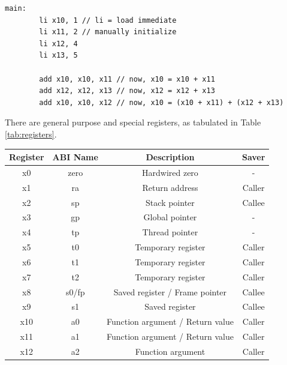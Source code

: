 \begin{lstlisting}[]
    main:
        li x10, 1 // li = load immediate
        li x11, 2 // manually initialize
        li x12, 4
        li x13, 5

        add x10, x10, x11 // now, x10 = x10 + x11
        add x12, x12, x13 // now, x12 = x12 + x13
        add x10, x10, x12 // now, x10 = (x10 + x11) + (x12 + x13)
\end{lstlisting}

There are general purpose and special
registers, as tabulated in Table \ref{tab:registers}.
\begin{table}[h!]
    \centering
    \begin{tabular}{|c|c|c|c|}
        \hline
        \textbf{Register} & \textbf{ABI Name} & \textbf{Description}             & \textbf{Saver} \\
        \hline
        x0                & zero              & Hardwired zero                   & -              \\
        x1                & ra                & Return address                   & Caller         \\
        x2                & sp                & Stack pointer                    & Callee         \\
        x3                & gp                & Global pointer                   & -              \\
        x4                & tp                & Thread pointer                   & -              \\
        x5                & t0                & Temporary register               & Caller         \\
        x6                & t1                & Temporary register               & Caller         \\
        x7                & t2                & Temporary register               & Caller         \\
        x8                & s0/fp             & Saved register / Frame pointer   & Callee         \\
        x9                & s1                & Saved register                   & Callee         \\
        x10               & a0                & Function argument / Return value & Caller         \\
        x11               & a1                & Function argument / Return value & Caller         \\
        x12               & a2                & Function argument                & Caller         \\

\end{tabular}
\end{table}
